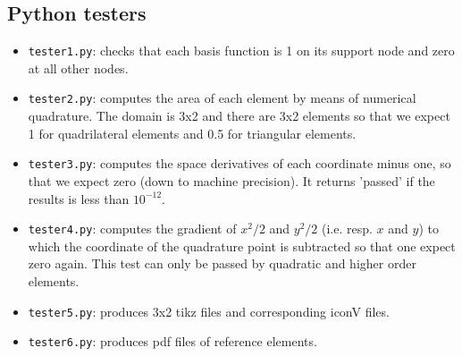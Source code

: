 \begin{multicols}{2}


\begin{tiny}

\end{tiny}
\end{multicols}

%

%

\begin{multicols}{2}


\begin{tiny}

\end{tiny}
\end{multicols}




\newpage
\subsection*{Python testers}

\begin{itemize}
\item \lstinline{tester1.py}: checks that each basis function is 1 on its support node and zero at all other nodes.
\item \lstinline{tester2.py}: computes the area of each element by means of numerical quadrature. The domain is 3x2 and there are 3x2 elements so that we expect 1 for quadrilateral elements and 0.5 for triangular elements.  
\item \lstinline{tester3.py}: computes the space derivatives of each coordinate minus one, so that we expect zero (down to machine precision). It returns 'passed' if the results is less than $10^{-12}$.   
\item \lstinline{tester4.py}: computes the gradient of $x^2/2$ and $y^2/2$ (i.e. resp. $x$ and $y$) to which the coordinate of the quadrature point is subtracted so that one expect zero again. This test can only be passed by quadratic and higher order elements.
\item \lstinline{tester5.py}: produces 3x2 tikz files and corresponding iconV files. 
\item \lstinline{tester6.py}: produces pdf files of reference elements.
\end{itemize}


